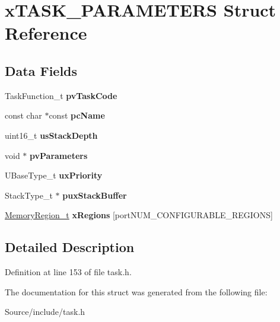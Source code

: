 \hypertarget{structx_t_a_s_k___p_a_r_a_m_e_t_e_r_s}{}\section{x\+T\+A\+S\+K\+\_\+\+P\+A\+R\+A\+M\+E\+T\+E\+R\+S Struct Reference}
\label{structx_t_a_s_k___p_a_r_a_m_e_t_e_r_s}
\subsection*{Data Fields}
\begin{DoxyCompactItemize}
\item 
\hypertarget{structx_t_a_s_k___p_a_r_a_m_e_t_e_r_s_a06aee8b42bc6c569b62ab3cdc4abf8b0}{}Task\+Function\+\_\+t {\bfseries pv\+Task\+Code}\label{structx_t_a_s_k___p_a_r_a_m_e_t_e_r_s_a06aee8b42bc6c569b62ab3cdc4abf8b0}

\item 
\hypertarget{structx_t_a_s_k___p_a_r_a_m_e_t_e_r_s_a2de8afaf668518af9982627791b2cc23}{}const char $\ast$const {\bfseries pc\+Name}\label{structx_t_a_s_k___p_a_r_a_m_e_t_e_r_s_a2de8afaf668518af9982627791b2cc23}

\item 
\hypertarget{structx_t_a_s_k___p_a_r_a_m_e_t_e_r_s_aae6fa1f3cc5f8b931225ed4b454f3865}{}uint16\+\_\+t {\bfseries us\+Stack\+Depth}\label{structx_t_a_s_k___p_a_r_a_m_e_t_e_r_s_aae6fa1f3cc5f8b931225ed4b454f3865}

\item 
\hypertarget{structx_t_a_s_k___p_a_r_a_m_e_t_e_r_s_a308cef200968d514395c0272c061d3ec}{}void $\ast$ {\bfseries pv\+Parameters}\label{structx_t_a_s_k___p_a_r_a_m_e_t_e_r_s_a308cef200968d514395c0272c061d3ec}

\item 
\hypertarget{structx_t_a_s_k___p_a_r_a_m_e_t_e_r_s_a0befed3dd0fe55b4314158f4814f50ae}{}U\+Base\+Type\+\_\+t {\bfseries ux\+Priority}\label{structx_t_a_s_k___p_a_r_a_m_e_t_e_r_s_a0befed3dd0fe55b4314158f4814f50ae}

\item 
\hypertarget{structx_t_a_s_k___p_a_r_a_m_e_t_e_r_s_a3f80c2175bac00298ba9a17ddd50e29d}{}Stack\+Type\+\_\+t $\ast$ {\bfseries pux\+Stack\+Buffer}\label{structx_t_a_s_k___p_a_r_a_m_e_t_e_r_s_a3f80c2175bac00298ba9a17ddd50e29d}

\item 
\hypertarget{structx_t_a_s_k___p_a_r_a_m_e_t_e_r_s_a7bc9c069ce3a5e929c7ef29e95184584}{}\hyperlink{structx_m_e_m_o_r_y___r_e_g_i_o_n}{Memory\+Region\+\_\+t} {\bfseries x\+Regions} \mbox{[}port\+N\+U\+M\+\_\+\+C\+O\+N\+F\+I\+G\+U\+R\+A\+B\+L\+E\+\_\+\+R\+E\+G\+I\+O\+N\+S\mbox{]}\label{structx_t_a_s_k___p_a_r_a_m_e_t_e_r_s_a7bc9c069ce3a5e929c7ef29e95184584}

\end{DoxyCompactItemize}


\subsection{Detailed Description}


Definition at line 153 of file task.\+h.



The documentation for this struct was generated from the following file\+:\begin{DoxyCompactItemize}
\item 
Source/include/task.\+h\end{DoxyCompactItemize}
